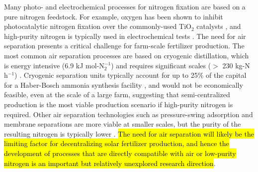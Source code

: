 Many photo- and electrochemical processes for nitrogen fixation are based on a pure nitrogen feedstock. For example, oxygen has been shown to inhibit photocatalytic nitrogen fixation over the commonly-used TiO$_2$ catalysts \cite{Hirakawa_2017}, and high-purity nitrogen is typically used in electrochemical tests \cite{Song_2018, lan2013synthesis,wang2018greening}. The need for air separation presents a critical challenge for farm-scale fertilizer production. The most common air separation processes are based on cryogenic distillation, which is energy intensive (6.9 kJ mol-N$_2^{-1}$) \cite{TANIGUCHI_2015} and requires significant scales ($>$ 230 kg-N h$^{-1}$) \cite{kirk_nitro_2005}. Cryogenic separation units typically account for up to 25\% of the capital for a Haber-Bosch ammonia synthesis facility \cite{Bartels}, and would not be economically feasible, even at the scale of a large farm, suggesting that semi-centralized production is the most viable production scenario if high-purity nitrogen is required. Other air separation technologies such as pressure-swing adsorption and membrane separations are more viable at smaller scales, but the purity of the resulting nitrogen is typically lower \cite{Smith_2001}. 
\hl{The need for air separation will likely be the limiting factor for decentralizing solar fertilizer production, and hence the development of processes that are directly compatible with air or low-purity nitrogen is an important but relatively unexplored research direction}. %

